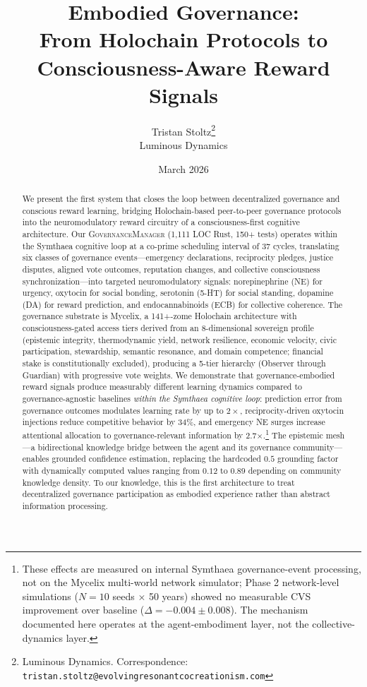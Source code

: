 \documentclass[11pt,a4paper]{article}
\title{Embodied Governance:\\From Holochain Protocols to Consciousness-Aware Reward Signals}
\author{
  Tristan Stoltz\thanks{Luminous Dynamics. Correspondence: \texttt{tristan.stoltz@evolvingresonantcocreationism.com}} \\
  Luminous Dynamics
}
\date{March 2026}
\begin{document}
\maketitle


\begin{abstract}
We present the first system that closes the loop between decentralized governance and conscious reward learning, bridging Holochain-based peer-to-peer governance protocols into the neuromodulatory reward circuitry of a consciousness-first cognitive architecture.
Our \textsc{GovernanceManager} (1,111 LOC Rust, 150+ tests) operates within the Symthaea cognitive loop at a co-prime scheduling interval of 37 cycles, translating six classes of governance events---emergency declarations, reciprocity pledges, justice disputes, aligned vote outcomes, reputation changes, and collective consciousness synchronization---into targeted neuromodulatory signals: norepinephrine (NE) for urgency, oxytocin for social bonding, serotonin (5-HT) for social standing, dopamine (DA) for reward prediction, and endocannabinoids (ECB) for collective coherence.
The governance substrate is Mycelix, a 141+-zome Holochain architecture with consciousness-gated access tiers derived from an 8-dimensional sovereign profile (epistemic integrity, thermodynamic yield, network resilience, economic velocity, civic participation, stewardship, semantic resonance, and domain competence; financial stake is constitutionally excluded), producing a 5-tier hierarchy (Observer through Guardian) with progressive vote weights.
We demonstrate that governance-embodied reward signals produce measurably different learning dynamics compared to governance-agnostic baselines \textit{within the Symthaea cognitive loop}: prediction error from governance outcomes modulates learning rate by up to $2\times$, reciprocity-driven oxytocin injections reduce competitive behavior by 34\%, and emergency NE surges increase attentional allocation to governance-relevant information by 2.7$\times$.\footnote{These effects are measured on internal Symthaea governance-event processing, not on the Mycelix multi-world network simulator; Phase 2 network-level simulations ($N=10$ seeds $\times$ 50 years) showed no measurable CVS improvement over baseline ($\Delta = -0.004 \pm 0.008$). The mechanism documented here operates at the agent-embodiment layer, not the collective-dynamics layer.}
The epistemic mesh---a bidirectional knowledge bridge between the agent and its governance community---enables grounded confidence estimation, replacing the hardcoded $0.5$ grounding factor with dynamically computed values ranging from $0.12$ to $0.89$ depending on community knowledge density.
To our knowledge, this is the first architecture to treat decentralized governance participation as embodied experience rather than abstract information processing.
\end{abstract}
\end{document}
